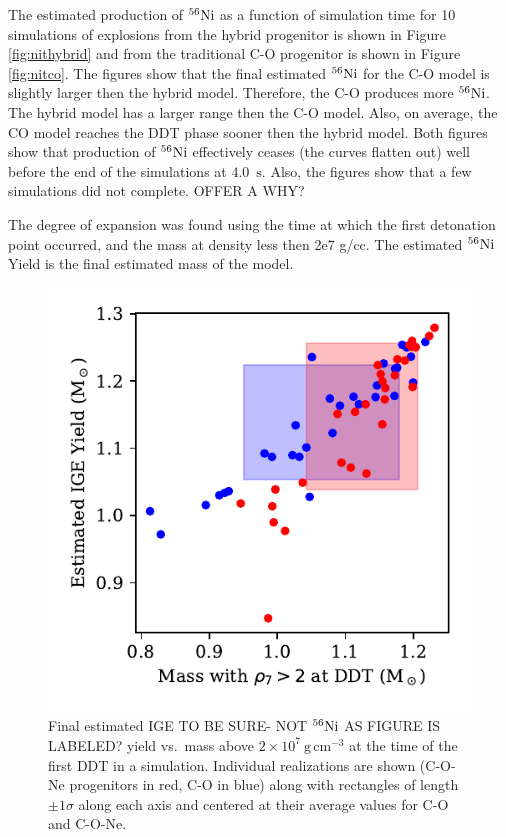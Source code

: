 \documentclass[iop,apj]{emulateapj}
\newcommand{\Ni}[1]{\ensuremath{{}^{#1}{\rm Ni}}}
\newcommand{\unitspace}{\ensuremath{\,}}
\newcommand{\usp}{\unitspace}
\newcommand{\unitstyle}[1]{\ensuremath{\mathrm{#1}}}
\newcommand{\power}[2]{\ensuremath{{#1}^{#2}}}
\newcommand{\centi}{\unitstyle{c}}
\newcommand{\meter}{\unitstyle{m}}
\newcommand{\second}{\unitstyle{s}}
\newcommand{\cm}{\centi\meter}
\newcommand{\gram}{\unitstyle{g}}
\newcommand{\grampercc}{\gram\usp\power{\cm}{-3}} %
\begin{document}
The estimated production of \Ni{56} as a function of simulation time
for 10 simulations of explosions from the hybrid progenitor is shown
in Figure \ref{fig:nithybrid} and from the traditional C-O progenitor is
shown in Figure \ref{fig:nitco}.
The figures show that the final estimated \Ni{56} for the C-O model is
slightly larger then the hybrid model. Therefore, the C-O produces more
\Ni{56}. The hybrid model has a larger range then the C-O model. Also, on
average, the CO model reaches the DDT phase sooner then the hybrid model.
Both figures show that production of \Ni{56} effectively ceases (the
curves flatten out) well before the end of the simulations at 
$4.0$~\second. Also, the figures show that a few simulations
did not complete. {\color{red} OFFER A WHY?}

The degree of expansion was found using the time at which the first
detonation point occurred, and the mass at density less then 2e7 g/cc. The
estimated \Ni{56} Yield is the final estimated mass of the model.

\begin{figure}
\includegraphics[width=\columnwidth]{figures/ni56_yield_vs_mass_at_high_dens.pdf}
\caption{\label{fig:masshighdens}
Final estimated IGE {\color{red} 
TO BE SURE- NOT \Ni{56} AS FIGURE IS LABELED?} yield 
vs.\ mass {\color{red} above} $2\times 10^7~\grampercc$
at the time of the first DDT in a simulation.  Individual 
realizations are shown (C-O-Ne
progenitors in red, C-O in blue) along with rectangles of length
$\pm 1 \sigma$ along each axis and centered at their average values 
for C-O and C-O-Ne.
}
\end{figure}
\end{document}
